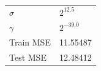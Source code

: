\begin{tabular}{ll}
\toprule
\midrule
$\sigma$ & $2^{12.5}$ \\
$\gamma$ & $2^{-39.0}$ \\
Train MSE & 11.55487 \\
Test MSE & 12.48412 \\
\bottomrule
\end{tabular}
